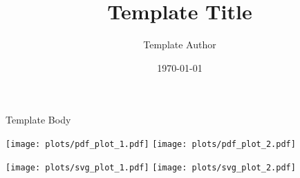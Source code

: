 \documentclass{article}
\title{Template Title}
\author{Template Author}
\date{\today}
\begin{document}
\maketitle

Template Body

\begin{center}
\texttt{[image: plots/pdf\_plot\_1.pdf]}
\texttt{[image: plots/pdf\_plot\_2.pdf]}

\texttt{[image: plots/svg\_plot\_1.pdf]}
\texttt{[image: plots/svg\_plot\_2.pdf]}
\par\end{center}
\end{document}
